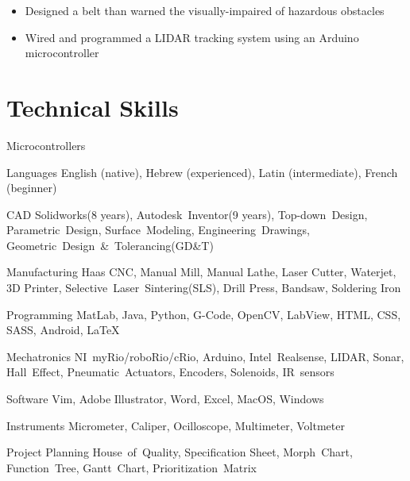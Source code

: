 \documentclass{resume}
\begin{document}

\begin{itemize}
  \item Designed a belt than warned the visually-impaired of hazardous obstacles
  \item Wired and programmed a LIDAR tracking system using an Arduino microcontroller
\end{itemize}


\section{Technical Skills}
\begin{skills}{Microcontrollers}
  \item [Languages] English (native), Hebrew (experienced), Latin (intermediate), French (beginner)
  \item [CAD] Solidworks(8 years), Autodesk~Inventor(9 years), Top-down~Design, Parametric~Design, Surface~Modeling, Engineering~Drawings, Geometric~Design~\&~Tolerancing(GD\&T)
  \item [Manufacturing] Haas CNC, Manual Mill, Manual Lathe, Laser Cutter, Waterjet, 3D Printer, Selective~Laser~Sintering(SLS), Drill Press, Bandsaw, Soldering Iron
  \item [Programming] MatLab, Java, Python, G-Code, OpenCV, LabView, HTML, CSS, SASS, Android, \LaTeX
  \item [Mechatronics] NI~myRio/roboRio/cRio, Arduino, Intel~Realsense, LIDAR, Sonar, Hall~Effect, Pneumatic~Actuators, Encoders, Solenoids, IR~sensors
  \item [Software] Vim, Adobe Illustrator, Word, Excel, MacOS, Windows
  \item [Instruments] Micrometer, Caliper, Ocilloscope, Multimeter, Voltmeter
  \item [Project Planning] House~of~Quality, Specification Sheet, Morph~Chart, Function~Tree, Gantt~Chart, Prioritization~Matrix
\end{skills}
\end{document}
